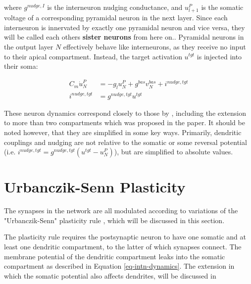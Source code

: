 where $ g^{nudge, I}$ is the interneuron nudging conductance, and $u_{l+1}^P$ is the somatic voltage of a corresponding
pyramidal neuron in the next layer. Since each interneuron is innervated by exactly one pyramidal neuron and vice versa,
they will be called each others \textbf{sister neurons} from here on.. Pyramidal neurons
in the output layer $N$ effectively behave like interneurons, as they receive no input to their apical compartment.
Instead, the target  activation $u^{tgt}$ is injected into their soma:

\begin{align}
  C_m \dot{u}_N^P & = - g_l u_N^{P} + g^{bas} v_N^{bas} + i^{nudge, tgt} \\
  i^{nudge, tgt}  & = g^{nudge, tgt} u^{tgt}
\end{align}


These neuron dynamics correspond closely to those by \cite{urbanczik2014learning}, including the extension to more than
two compartments which was proposed in the paper. It should be noted however, that they are simplified in some key ways.
Primarily, dendritic couplings and nudging are not relative to the somatic or some reversal potential (i.e. $i^{nudge,
tgt}= g^{nudge, tgt} (u^{tgt} - u_N^P )$), but are simplified to absolute values. 








\section{Urbanczik-Senn Plasticity}\label{sec-urb-senn-plast}

The synapses in the network are all modulated according to variations of the "Urbanczik-Senn" plasticity rule
\citep{urbanczik2014learning}, which will be discussed in this section. 

The plasticity rule requires the postsynaptic neuron to have one somatic and at least one dendritic compartment, to the
latter of which synapses connect. The membrane potential of the dendritic compartment leaks into the somatic compartment
as described in Equation \ref{eq-intn-dynamics}. The extension in which the somatic potential also affects dendrites,
will be discussed in



